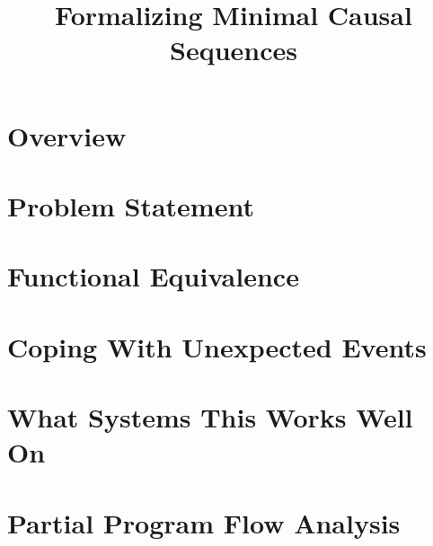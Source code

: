 \documentclass{article}
\begin{document}
\title{Formalizing Minimal Causal Sequences}
   \date{}
   \maketitle
   \thispagestyle{empty}

\section{Overview}
\label{sec:intro}


\section{Problem Statement}
\label{sec:problem_statement}


\section{Functional Equivalence}
\label{sec:functional_equivs}


\section{Coping With Unexpected Events}
\label{sec:unexpected}


\section{What Systems This Works Well On}
\label{sec:systems}


\section{Partial Program Flow Analysis}
\label{sec:program_flow}


\renewcommand{\baselinestretch}{0.97}


%
\end{document}
